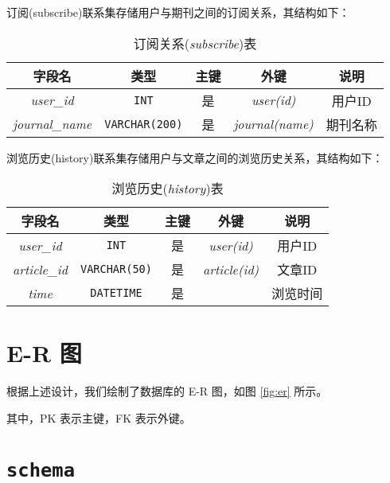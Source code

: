 \documentclass[UTF8,openany]{ctexbook}
\begin{document}
订阅(subscribe)联系集存储用户与期刊之间的订阅关系，其结构如下：

\begin{table}[H]
    \centering
    \begin{tabular}{|c|c|c|c|c|}
        \hline
        \textbf{字段名} & \textbf{类型} & \textbf{主键} & \textbf{外键} & \textbf{说明} \\
        \hline
        \textit{user\_id} & \texttt{INT} & 是 & \textit{user(id)} & 用户ID \\
        \hline
        \textit{journal\_name} & \texttt{VARCHAR(200)} & 是 & \textit{journal(name)} & 期刊名称 \\
        \hline
    \end{tabular}
    \caption{订阅关系(\textit{subscribe})表}
\end{table}

浏览历史(history)联系集存储用户与文章之间的浏览历史关系，其结构如下：

\begin{table}[H]
    \centering
    \begin{tabular}{|c|c|c|c|c|}
        \hline
        \textbf{字段名} & \textbf{类型} & \textbf{主键} & \textbf{外键} & \textbf{说明} \\
        \hline
        \textit{user\_id} & \texttt{INT} & 是 & \textit{user(id)} & 用户ID \\
        \hline
        \textit{article\_id} & \texttt{VARCHAR(50)} & 是 & \textit{article(id)} & 文章ID \\
        \hline
        \textit{time} & \texttt{DATETIME} & 是 &  & 浏览时间 \\
        \hline
    \end{tabular}
    \caption{浏览历史(\textit{history})表}
\end{table}

\section{E-R 图}


根据上述设计，我们绘制了数据库的 E-R 图，如图 \ref{fig:er} 所示。


其中，PK 表示主键，FK 表示外键。

\section{\texttt{schema}}
\end{document}
